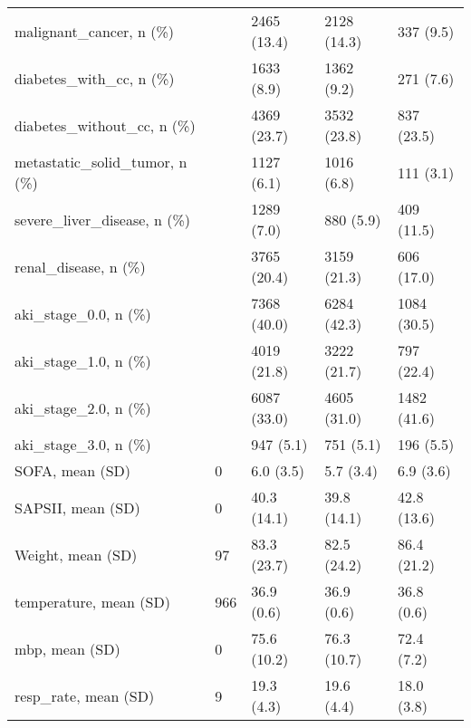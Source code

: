 \begin{tabular}{lllll}
malignant\_cancer, n (\%)                           &         &    2465 (13.4) &       2128 (14.3) &              337 (9.5) \\
diabetes\_with\_cc, n (\%)                           &         &     1633 (8.9) &        1362 (9.2) &              271 (7.6) \\
diabetes\_without\_cc, n (\%)                        &         &    4369 (23.7) &       3532 (23.8) &             837 (23.5) \\
metastatic\_solid\_tumor, n (\%)                     &         &     1127 (6.1) &        1016 (6.8) &              111 (3.1) \\
severe\_liver\_disease, n (\%)                       &         &     1289 (7.0) &         880 (5.9) &             409 (11.5) \\
renal\_disease, n (\%)                              &         &    3765 (20.4) &       3159 (21.3) &             606 (17.0) \\
aki\_stage\_0.0, n (\%)                              &         &    7368 (40.0) &       6284 (42.3) &            1084 (30.5) \\
aki\_stage\_1.0, n (\%)                              &         &    4019 (21.8) &       3222 (21.7) &             797 (22.4) \\
aki\_stage\_2.0, n (\%)                              &         &    6087 (33.0) &       4605 (31.0) &            1482 (41.6) \\
aki\_stage\_3.0, n (\%)                              &         &      947 (5.1) &         751 (5.1) &              196 (5.5) \\
SOFA, mean (SD)                                   &       0 &      6.0 (3.5) &         5.7 (3.4) &              6.9 (3.6) \\
SAPSII, mean (SD)                                 &       0 &    40.3 (14.1) &       39.8 (14.1) &            42.8 (13.6) \\
Weight, mean (SD)                                 &      97 &    83.3 (23.7) &       82.5 (24.2) &            86.4 (21.2) \\
temperature, mean (SD)                            &     966 &     36.9 (0.6) &        36.9 (0.6) &             36.8 (0.6) \\
mbp, mean (SD)                                    &       0 &    75.6 (10.2) &       76.3 (10.7) &             72.4 (7.2) \\
resp\_rate, mean (SD)                              &       9 &     19.3 (4.3) &        19.6 (4.4) &             18.0 (3.8) \\

\end{tabular}
